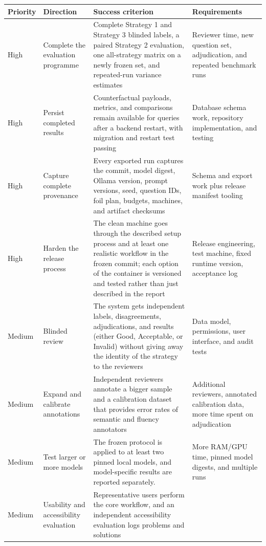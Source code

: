 \documentclass[11pt,a4paper]{article}
\begin{document}
\begin{table}[!htbp]
\centering
\footnotesize
\begin{tabularx}{\textwidth}{@{}L{1.05cm}L{2.5cm}Y Y@{}}
\toprule
\textbf{Priority} & \textbf{Direction} & \textbf{Success criterion} & \textbf{Requirements} \\
\midrule
High & Complete the evaluation programme & Complete Strategy 1 and Strategy 3 blinded
labels, a paired Strategy 2 evaluation, one all-strategy matrix on a newly frozen set,
and repeated-run variance estimates & Reviewer time, new question set, adjudication,
and repeated benchmark runs \\
High & Persist completed results & Counterfactual payloads, metrics, and comparisons
remain available for queries after a backend restart, with migration and restart test
passing & Database schema work, repository implementation, and testing \\
High & Capture complete provenance & Every exported run captures the commit, model
digest, Ollama version, prompt versions, seed, question IDs, foil plan, budgets,
machines, and artifact checksums & Schema and export work plus release manifest tooling \\
High & Harden the release process & The clean machine goes through the described
setup process and at least one realistic workflow in the frozen commit; each option of
the container is versioned and tested rather than just described in the report &
Release engineering, test machine, fixed runtime version, acceptance log \\
Medium & Blinded review & The system gets independent labels, disagreements,
adjudications, and results (either Good, Acceptable, or Invalid) without giving away the
identity of the strategy to the reviewers & Data model, permissions, user interface,
and audit tests \\
Medium & Expand and calibrate annotations & Independent reviewers annotate a bigger
sample and a calibration dataset that provides error rates of semantic and fluency
annotators & Additional reviewers, annotated calibration data, more time spent on
adjudication \\
Medium & Test larger or more models & The frozen protocol is applied to at least two
pinned local models, and model-specific results are reported separately. & More
RAM/GPU time, pinned model digests, and multiple runs \\
Medium & Usability and accessibility evaluation & Representative users perform the
core workflow, and an independent accessibility evaluation logs problems and solutions

\end{tabularx}
\end{table}
\end{document}
